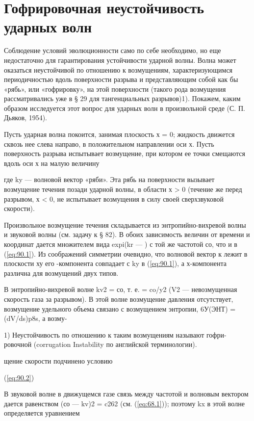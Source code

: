 \section{Гофрировочная неустойчивость ударных волн}\label{sec:p90}

Соблюдение условий эволюционности само по себе необходимо, но еще недостаточно
для гарантирования устойчивости ударной волны. Волна может оказаться
неустойчивой по отношению к возмущениям, характеризующимся периодичностью вдоль
поверхности разрыва и представляющим собой как бы «рябь», или «гофрировку», на
этой поверхности (такого рода возмущения рассматривались уже в § 29 для
тангенциальных разрывов)1). Покажем, каким образом исследуется этот вопрос для
ударных волн в произвольной среде (С. П. Дьяков, 1954).

Пусть ударная волна покоится, занимая плоскость х = 0; жидкость движется сквозь
нее слева направо, в положительном направлении оси х. Пусть поверхность разрыва
испытывает возмущение, при котором ее точки смещаются вдоль оси х на малую
величину


где ky — волновой вектор «ряби». Эта рябь на поверхности вызывает возмущение
течения позади ударной волны, в области х > 0 (течение же перед разрывом, х <
0, не испытывает возмущения в силу своей сверхзвуковой скорости).

Произвольное возмущение течения складывается из энтропийно-вихревой волны и
звуковой волны (см. задачу к § 82). В обоих зависимость величин от времени и
координат дается множителем вида expi(kr — ) с той же частотой со, что и в
(\ref{eq:90.1}). Из соображений симметрии очевидно, что волновой вектор к лежит
в плоскости ху его -компонента совпадает с ky в (\ref{eq:90.1}), а х-компонента
различна для возмущений двух типов.

В энтропийно-вихревой волне kv2 = со, т. е. = co/y2 (V2 — невозмущенная
скорость газа за разрывом). В этой волне возмущение давления отсутствует,
возмущение удельного объема связано с возмущением энтропии, 6У(ЭНТ) =
(dV/ds)p8s, а возму-

1) Неустойчивость по отношению к таким возмущениям называют гофри-ровочной
(corrugation Instability по английской терминологии).


щение скорости подчинено условию


(\ref{eq:90.2})

В звуковой волне в движущемся газе связь между частотой и волновым вектором
дается равенством (со — kv)2 = c262 (см. (\ref{eq:68.1})); поэтому kx в этой
волне определяется уравнением

